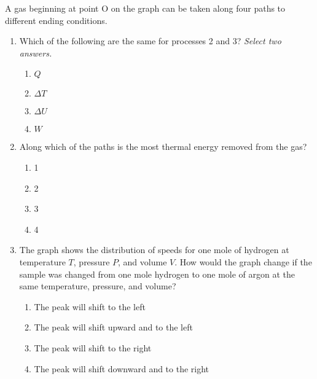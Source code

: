 \documentclass{../../../oss-apphys}
\begin{document}
\begin{multicols}{2}
  A gas beginning at point O on the graph can be taken along four paths to
  different ending conditions.
  \begin{center}
    \vspace{-.15in}
  \end{center}
  \begin{enumerate}[leftmargin=18pt,start=24]

  \item Which of the following are the same for processes 2 and 3?
    \emph{Select two answers.}
    \begin{enumerate}[noitemsep,topsep=0pt,leftmargin=18pt,label=(\Alph*)]
    \item $Q$
    \item $\Delta T$
    \item $\Delta U$
    \item $W$
    \end{enumerate}
    
  \item Along which of the paths is the most thermal energy removed from the
    gas?
    \begin{enumerate}[noitemsep,topsep=0pt,leftmargin=18pt,label=(\Alph*)]
      \item\num{1}
      \item\num{2}
      \item\num{3}
      \item\num{4}
    \end{enumerate}

    \columnbreak
    
  \item The graph shows the distribution of speeds for one mole of hydrogen at
    temperature $T$, pressure $P$, and volume $V$. How would the graph change
    if the sample was changed from one mole hydrogen to one mole of argon at
    the same temperature, pressure, and volume?
    \begin{center}
      \vspace{-.15in}
    \end{center}
    \begin{enumerate}[noitemsep,topsep=0pt,leftmargin=18pt,label=(\Alph*)]
    \item The peak will shift to the left
    \item The peak will shift upward and to the left
    \item The peak will shift to the right
    \item The peak will shift downward and to the right
    \end{enumerate}
    

\end{enumerate}
\end{multicols}
\end{document}

